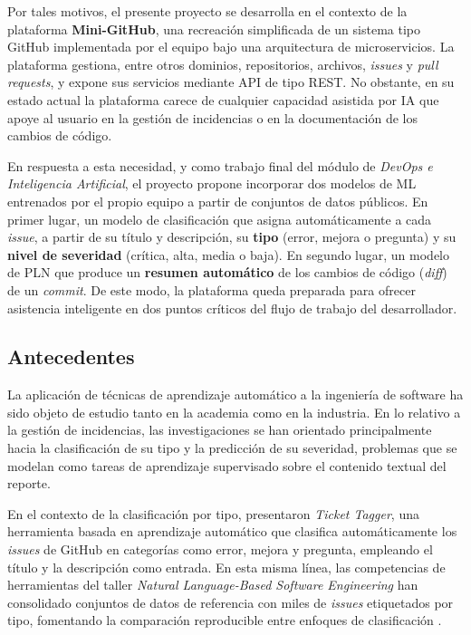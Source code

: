 Por tales motivos, el presente proyecto se desarrolla en el contexto de la plataforma \textbf{Mini-GitHub}, una recreación simplificada de un sistema tipo GitHub implementada por el equipo bajo una arquitectura de microservicios. La plataforma gestiona, entre otros dominios, repositorios, archivos, \textit{issues} y \textit{pull requests}, y expone sus servicios mediante \acrfull{API} de tipo \acrfull{REST}. No obstante, en su estado actual la plataforma carece de cualquier capacidad asistida por \acrshort{IA} que apoye al usuario en la gestión de incidencias o en la documentación de los cambios de código.

En respuesta a esta necesidad, y como trabajo final del módulo de \textit{DevOps e Inteligencia Artificial}, el proyecto propone incorporar dos modelos de \acrshort{ML} entrenados por el propio equipo a partir de conjuntos de datos públicos. En primer lugar, un modelo de clasificación que asigna automáticamente a cada \textit{issue}, a partir de su título y descripción, su \textbf{tipo} (error, mejora o pregunta) y su \textbf{nivel de severidad} (crítica, alta, media o baja). En segundo lugar, un modelo de \acrfull{PLN} que produce un \textbf{resumen automático} de los cambios de código (\textit{diff}) de un \textit{commit}. De este modo, la plataforma queda preparada para ofrecer asistencia inteligente en dos puntos críticos del flujo de trabajo del desarrollador.


\subsection{Antecedentes}

La aplicación de técnicas de aprendizaje automático a la ingeniería de software ha sido objeto de estudio tanto en la academia como en la industria. En lo relativo a la gestión de incidencias, las investigaciones se han orientado principalmente hacia la clasificación de su tipo y la predicción de su severidad, problemas que se modelan como tareas de aprendizaje supervisado sobre el contenido textual del reporte.

En el contexto de la clasificación por tipo, \cite{Kallis2019} presentaron \textit{Ticket Tagger}, una herramienta basada en aprendizaje automático que clasifica automáticamente los \textit{issues} de GitHub en categorías como error, mejora y pregunta, empleando el título y la descripción como entrada. En esta misma línea, las competencias de herramientas del taller \textit{Natural Language-Based Software Engineering} han consolidado conjuntos de datos de referencia con miles de \textit{issues} etiquetados por tipo, fomentando la comparación reproducible entre enfoques de clasificación \citep{NLBSE2024}.

